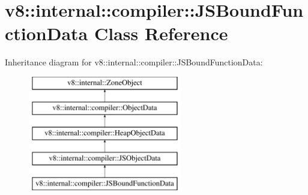 \hypertarget{classv8_1_1internal_1_1compiler_1_1JSBoundFunctionData}{}\section{v8\+:\+:internal\+:\+:compiler\+:\+:J\+S\+Bound\+Function\+Data Class Reference}
\label{classv8_1_1internal_1_1compiler_1_1JSBoundFunctionData}
Inheritance diagram for v8\+:\+:internal\+:\+:compiler\+:\+:J\+S\+Bound\+Function\+Data\+:\begin{figure}[H]
\begin{center}
\leavevmode
\includegraphics[height=5.000000cm]{classv8_1_1internal_1_1compiler_1_1JSBoundFunctionData}
\end{center}
\end{figure}
